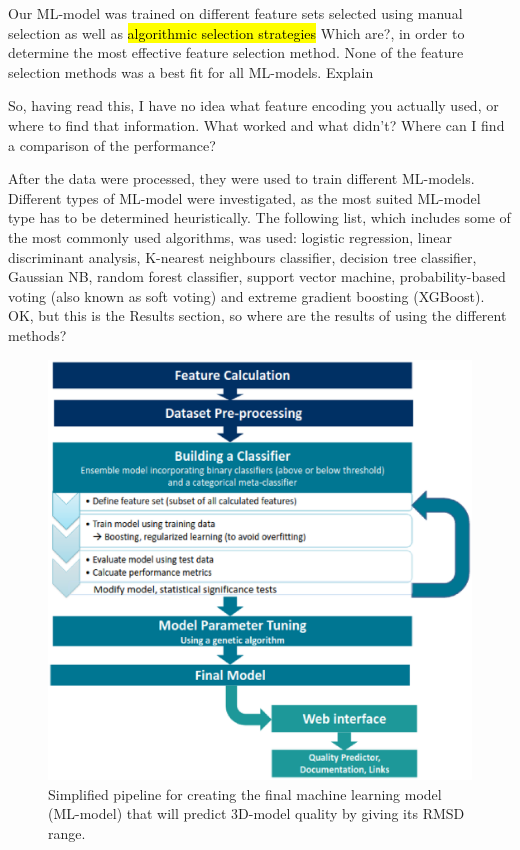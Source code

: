 \documentclass[12pt]{article}
\newcommand{\lilian}[1]{ {\color{red}{\bfseries Lilian:} #1}}
\newcommand{\highlight}[1]{\hl{#1}}
\begin{document}
Our ML-model was trained on different feature sets selected using manual
selection as well as \highlight{algorithmic selection strategies}\lilian{Which are?}, in order to
determine the most effective feature selection method. None of the
feature selection methods was a best fit for all ML-models.\lilian{Explain}

\lilian{So, having read this, I have no idea what feature encoding you
  actually used, or where to find that information. What worked and
  what didn't? Where can I find a comparison of the performance?}

After the data were processed, they were used to train different
ML-models. Different types of ML-model were investigated, as the most
suited ML-model type has to be determined heuristically. 
The following list, which includes some of the most commonly used
algorithms, was used: logistic regression, linear discriminant analysis,
K-nearest neighbours classifier, decision tree classifier, Gaussian
NB, random forest classifier, support vector machine,
probability-based voting (also known as soft voting) and extreme
gradient boosting (XGBoost)\cite{Chen2016}.
\lilian{OK, but this is the Results section, so where are the results
  of using the different methods?}

\begin{figure}
  \centering
  \includegraphics[width=\linewidth]{method.eps}
  \caption {Simplified pipeline for creating the final machine
    learning model (ML-model) that will predict 3D-model quality by giving its RMSD
    range.}
  \label{fig:method}
\end{figure}
\end{document}
